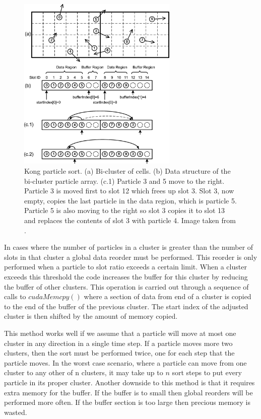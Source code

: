\begin{figure}
\begin{center}
\includegraphics[width=3in]{design/kong_sort.png}
\end{center}
\caption{Kong particle sort. (a) Bi-cluster of cells. (b) Data structure of the bi-cluster particle array. (c.1) Particle 3 and 5 move to the right. Particle 3 is moved first to slot 12 which frees up slot 3. Slot 3, now empty, copies the last particle in the data region, which is particle 5. Particle 5 is also moving to the right so slot 3 copies it to slot 13 and replaces the contents of slot 3 with particle 4. Image taken from \cite{Kong2011}.}
\label{fig:kong_sort}
\end{figure}

	In cases where the number of particles in a cluster is greater than the number of slots in that cluster a global data reorder must be performed. This reorder is only performed when a particle to slot ratio exceeds a certain limit. When a cluster exceeds this threshold the code increases the buffer for this cluster by reducing the buffer of other clusters. This operation is carried out through a sequence of calls to $cudaMemcpy()$ where a section of data from end of a cluster is copied to the end of the buffer of the previous cluster. The start index of the adjusted cluster is then shifted by the amount of memory copied. \cite{Kong2011}

	This method works well if we assume that a particle will move at most one cluster in any direction in a single time step. If a particle moves more two clusters, then the sort must be performed twice, one for each step that the particle moves. In the worst case scenario, where a particle can move from one cluster to any other of n clusters, it may take up to $n$ sort steps to put every particle in its proper cluster. Another downside to this method is that it requires extra memory for the buffer. If the buffer is to small then global reorders will be performed more often. If the buffer section is too large then precious memory is wasted. 

